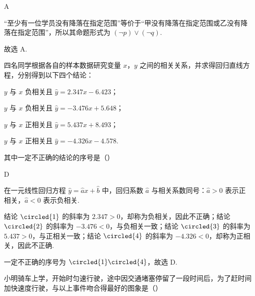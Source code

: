 \begin{answer}
A
\end{answer}

\begin{solution}
“至少有一位学员没有降落在指定范围”等价于“甲没有降落在指定范围或乙没有降落在指定范围”，所以其命题形式为 \((\neg p)\vee(\neg q)\).

故选 A.
\end{solution}

\begin{problem}
四名同学根据各自的样本数据研究变量 \(x\)，\(y\) 之间的相关关系，并求得回归直线方程，分别得到以下四个结论：

\begin{circlelist}
\item \(y\) 与 \(x\) 负相关且 \(\hat{y}=2.347x-6.423\)；
\item \(y\) 与 \(x\) 负相关且 \(\hat{y}=-3.476x+5.648\)；
\item \(y\) 与 \(x\) 正相关且 \(\hat{y}=5.437x+8.493\)；
\item \(y\) 与 \(x\) 正相关且 \(\hat{y}=-4.326x-4.578\).
\end{circlelist}

其中一定不正确的结论的序号是（\quad）

\choices
    {}
    {}
    {}
    {}
\end{problem}

\begin{answer}
D
\end{answer}

\begin{solution}
在一元线性回归方程 \(\hat y=\hat a x+\hat b\) 中，回归系数 \(\hat a\) 与相关系数同号：\(\hat a>0\) 表示正相关，\(\hat a<0\) 表示负相关.

结论 \(\circled{1}\) 的斜率为 \(2.347>0\)，却称为负相关，因此不正确；结论 \(\circled{2}\) 的斜率为 \(-3.476<0\)，与负相关一致；结论 \(\circled{3}\) 的斜率为 \(5.437>0\)，与正相关一致；结论 \(\circled{4}\) 的斜率为 \(-4.326<0\)，却称为正相关，因此不正确.

一定不正确的序号为 \(\circled{1}\circled{4}\)，故选 D.
\end{solution}

\begin{problem}
小明骑车上学，开始时匀速行驶，途中因交通堵塞停留了一段时间后，为了赶时间加快速度行驶，与以上事件吻合得最好的图象是（\quad）

    {}
    {}
    {}
\end{problem}

